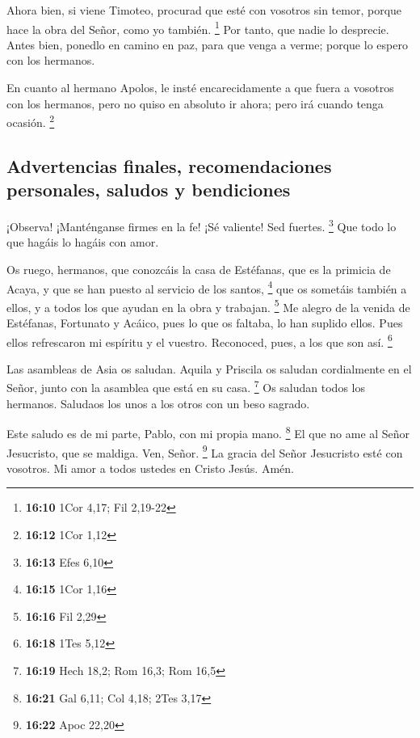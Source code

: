 \begin{paracol}{2}
 Ahora bien, si viene Timoteo, procurad que esté con
vosotros sin temor, porque hace la obra del Señor, como yo también.
\footnote{\textbf{16:10} 1Cor 4,17; Fil 2,19-22}  Por
tanto, que nadie lo desprecie. Antes bien, ponedlo en camino en paz,
para que venga a verme; porque lo espero con los hermanos.

 En cuanto al hermano Apolos, le insté encarecidamente a
que fuera a vosotros con los hermanos, pero no quiso en absoluto ir
ahora; pero irá cuando tenga ocasión. \footnote{\textbf{16:12} 1Cor 1,12}

\hypertarget{advertencias-finales-recomendaciones-personales-saludos-y-bendiciones}{%
\subsection{Advertencias finales, recomendaciones personales, saludos y
bendiciones}\label{advertencias-finales-recomendaciones-personales-saludos-y-bendiciones}}

 ¡Observa! ¡Manténganse firmes en la fe! ¡Sé valiente!
Sed fuertes. \footnote{\textbf{16:13} Efes 6,10}  Que
todo lo que hagáis lo hagáis con amor.

 Os ruego, hermanos, que conozcáis la casa de Estéfanas,
que es la primicia de Acaya, y que se han puesto al servicio de los
santos, \footnote{\textbf{16:15} 1Cor 1,16}  que os
sometáis también a ellos, y a todos los que ayudan en la obra y
trabajan. \footnote{\textbf{16:16} Fil 2,29}  Me alegro
de la venida de Estéfanas, Fortunato y Acáico, pues lo que os faltaba,
lo han suplido ellos.  Pues ellos refrescaron mi espíritu
y el vuestro. Reconoced, pues, a los que son así. \footnote{\textbf{16:18}
  1Tes 5,12}

 Las asambleas de Asia os saludan. Aquila y Priscila os
saludan cordialmente en el Señor, junto con la asamblea que está en su
casa. \footnote{\textbf{16:19} Hech 18,2; Rom 16,3; Rom 16,5}
 Os saludan todos los hermanos. Saludaos los unos a los
otros con un beso sagrado.

 Este saludo es de mi parte, Pablo, con mi propia mano.
\footnote{\textbf{16:21} Gal 6,11; Col 4,18; 2Tes 3,17} 
El que no ame al Señor Jesucristo, que se maldiga. Ven, Señor.
\footnote{\textbf{16:22} Apoc 22,20}  La gracia del Señor
Jesucristo esté con vosotros.  Mi amor a todos ustedes en
Cristo Jesús. Amén. \switchcolumn
\begin{otherlanguage}{english}


\end{otherlanguage}
\end{paracol}

